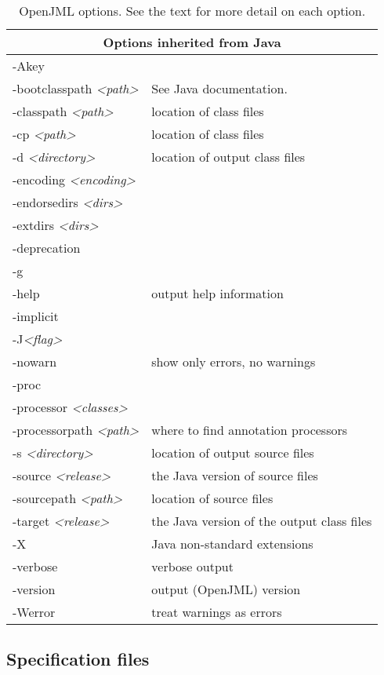 \begin{table}
{\begin{tabular}{|l|p{1.4in}|}
\hline
\multicolumn{2}{|c|}{Options inherited from Java} \\
\hline
-Akey & \\ \hline
-bootclasspath {\it <path>}& See Java documentation. \\ \hline
-classpath {\it <path>}& location of class files \\ \hline
-cp {\it <path>}& location of class files\\ \hline
-d {\it <directory>} & location of output class files\\ \hline
-encoding {\it <encoding>} & \\ \hline
-endorsedirs {\it <dirs>} & \\ \hline
-extdirs {\it <dirs>} & \\ \hline
-deprecation & \\ \hline
-g & \\ \hline
-help & output help information\\ \hline
-implicit & \\ \hline
-J{\it <flag>} & \\ \hline
-nowarn & show only errors, no warnings \\ \hline
-proc & \\ \hline
-processor {\it <classes>} & \\ \hline
-processorpath {\it <path>} & where to find annotation processors\\ \hline
-s {\it <directory>} & location of output source files\\ \hline
-source {\it <release>} & the Java version of source files\\ \hline
-sourcepath {\it <path>} & location of source files\\ \hline
-target {\it <release>} & the Java version of the output class files\\ \hline
-X & Java non-standard extensions\\ \hline
-verbose & verbose output \\ \hline
-version & output (OpenJML) version\\ \hline
-Werror & treat warnings as errors \\ \hline

\end{tabular}
}
\caption{OpenJML options. See the text for more detail on each option.}
\label{Tab:Options}
\end{table}

\subsection{Specification files}
\label{SpecFiles}

